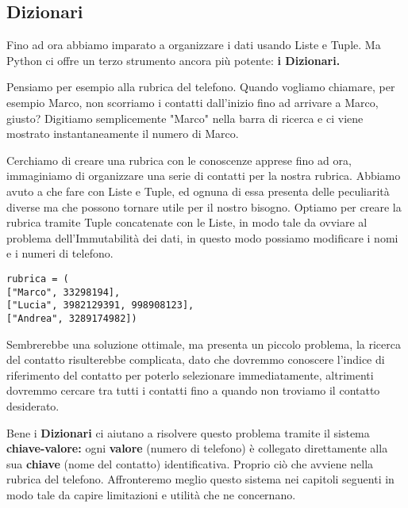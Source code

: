 \subsection{Dizionari}\label{IncipitDizionari}


Fino ad ora abbiamo imparato a organizzare i dati usando Liste e Tuple. Ma Python ci offre un terzo strumento ancora più potente: \textbf{i Dizionari.}

Pensiamo per esempio alla rubrica del telefono. Quando vogliamo chiamare, per esempio Marco, non scorriamo i contatti dall'inizio fino ad arrivare a Marco, giusto?
Digitiamo semplicemente "Marco" nella barra di ricerca e ci viene mostrato instantaneamente il numero di Marco.

Cerchiamo di creare una rubrica con le conoscenze apprese fino ad ora, immaginiamo di organizzare una serie di contatti per la nostra rubrica.
Abbiamo avuto a che fare con Liste e Tuple, ed ognuna di essa presenta delle peculiarità diverse ma che possono tornare utile per il nostro bisogno.
Optiamo per creare la rubrica tramite Tuple concatenate con le Liste, in modo tale da ovviare al problema dell'Immutabilità dei dati, in questo modo
possiamo modificare i nomi e i numeri di telefono.

\begin{lstlisting}
rubrica = (
["Marco", 33298194], 
["Lucia", 3982129391, 998908123],
["Andrea", 3289174982])
\end{lstlisting}

Sembrerebbe una soluzione ottimale, ma presenta un piccolo problema, la ricerca del contatto risulterebbe complicata, dato che dovremmo conoscere
l'indice di riferimento del contatto per poterlo selezionare immediatamente, altrimenti dovremmo cercare tra tutti i contatti fino a quando 
non troviamo il contatto desiderato.

Bene i \textbf{Dizionari} ci aiutano a risolvere questo problema tramite il sistema \textbf{chiave-valore:} ogni \textbf{valore} (numero di telefono)
è collegato direttamente alla sua \textbf{chiave} (nome del contatto) identificativa. Proprio ciò che avviene nella rubrica del telefono.
Affronteremo meglio questo sistema nei capitoli seguenti in modo tale da capire limitazioni e utilità che ne concernano.




